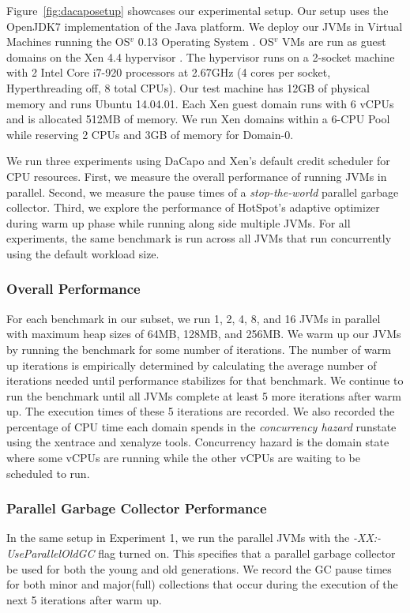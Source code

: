 \documentclass{sig-alternate}
\begin{document}
Figure~\ref{fig:dacaposetup} showcases our experimental setup. Our setup uses the OpenJDK7 implementation of the Java platform. We deploy our JVMs in Virtual Machines running the OS$^{v}$ 0.13 Operating System \cite{aviOSv2014}. OS$^{v}$ VMs are run as guest domains on the Xen 4.4 hypervisor \cite{barham2003xen}. The hypervisor runs on a 2-socket machine with 2 Intel Core i7-920 processors at 2.67GHz (4 cores per socket, Hyperthreading off,  8 total CPUs).  Our test machine has 12GB of physical memory and runs Ubuntu 14.04.01. Each Xen guest domain runs with 6 vCPUs and is allocated 512MB of memory. We run Xen domains within a 6-CPU Pool while reserving 2 CPUs and 3GB of memory for Domain-0.  

We run three experiments using DaCapo and Xen's default credit scheduler for CPU resources. First, we measure the overall performance of running JVMs in parallel. Second, we measure the pause times of a \textit{stop-the-world} parallel garbage collector. Third, we explore the performance of HotSpot's adaptive optimizer during warm up phase while running along side multiple JVMs. For all experiments, the same benchmark is run across all JVMs that run concurrently using the default workload size.

\subsubsection{Overall Performance} \label{sssec:overallperf}
For each benchmark in our subset, we run 1, 2, 4, 8, and 16 JVMs in parallel with maximum heap sizes of 64MB, 128MB, and 256MB. We warm up our JVMs by running the benchmark for some number of iterations. The number of warm up iterations is empirically determined by calculating the average number of iterations needed until performance stabilizes for that benchmark. We continue to run the benchmark until all JVMs complete at least 5 more iterations after warm up.  The execution times of these 5 iterations are recorded. We also recorded the percentage of CPU time each domain spends in the \textit{concurrency hazard} runstate using the xentrace and xenalyze tools. Concurrency hazard is the domain state where some vCPUs are running while the other vCPUs are waiting to be scheduled to run. 

\subsubsection{Parallel Garbage Collector Performance}
In the same setup in Experiment 1, we run the parallel JVMs with the \textit{-XX:-UseParallelOldGC} flag turned on. This specifies that a parallel garbage collector be used for both the young and old generations. We record the GC pause times for both minor and major(full) collections that occur during the execution of the next 5 iterations after warm up.
\end{document}
